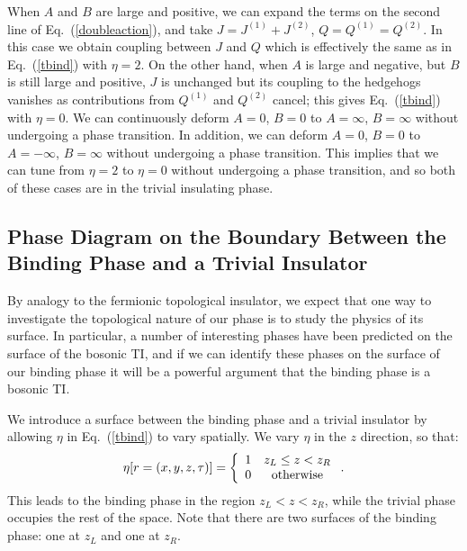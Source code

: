 \documentclass[prb,twocolumn]{revtex4-1}
\begin{document}
When $A$ and $B$ are large and positive, we can expand the terms on the second line of Eq.~(\ref{doubleaction}), and take $J = J^{(1)} + J^{(2)}$, $Q = Q^{(1)} = Q^{(2)}$. In this case we obtain coupling between $J$ and $Q$ which is effectively the same as in Eq.~(\ref{tbind}) with $\eta=2$. 
On the other hand, when $A$ is large and negative, but $B$ is still large and positive, $J$ is unchanged but its coupling to the hedgehogs vanishes as contributions from $Q^{(1)}$ and $Q^{(2)}$ cancel; this gives Eq.~(\ref{tbind}) with $\eta=0$.
We can continuously deform $A=0$, $B=0$ to $A=\infty$, $B=\infty$ without undergoing a phase transition. In addition, we can deform $A=0$, $B=0$ to $A=-\infty$, $B=\infty$ without undergoing a phase transition. This implies that we can tune from $\eta=2$ to $\eta=0$ without undergoing a phase transition, and so both of these cases are in the trivial insulating phase.


\subsection{Phase Diagram on the Boundary Between the Binding Phase and a Trivial Insulator}
\label{subsec:heissurf}
By analogy to the fermionic topological insulator, we expect that one way to investigate the topological nature of our phase is to study the physics of its surface. In particular, a number of interesting phases have been predicted on the surface of the bosonic TI,\cite{SenthilVishwanath} and if we can identify these phases on the surface of our binding phase it will be a powerful argument that the binding phase is a bosonic TI.

We introduce a surface between the binding phase and a trivial insulator by allowing $\eta$ in Eq.~(\ref{tbind}) to vary spatially.
We vary $\eta$ in the $z$ direction, so that:
\begin{equation}
\eta[r=(x,y,z,\tau)]=
\left\{ \begin{array}{cc}
1 & z_L\leq z<z_R\\
0 & \rm{otherwise}\\
\end{array}\right..
\label{eta_r}
\end{equation}
This leads to the binding phase in the region $z_L < z < z_R$, while the trivial phase occupies the rest of the space. Note that there are two surfaces of the binding phase: one at $z_L$ and one at $z_R$.
\end{document}
